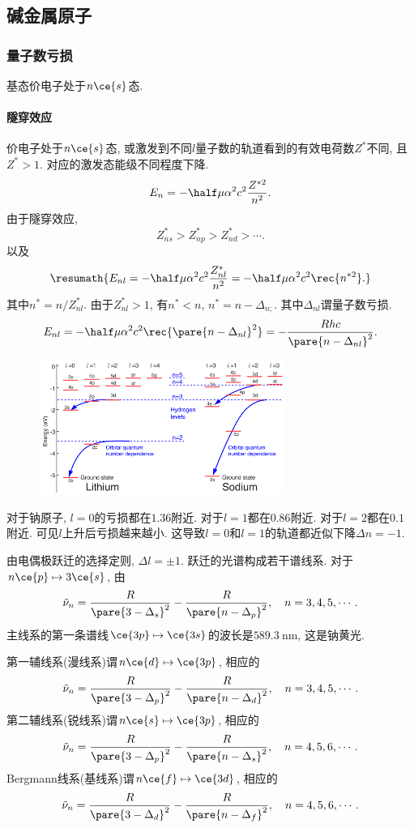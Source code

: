 \documentclass[hidelinks]{ctexart}
\begin{document}


\subsection{碱金属原子} %
\label{sub:碱金属原子}

\subsubsection{量子数亏损} %
\label{ssub:量子数亏损}

基态价电子处于$n\ce{s}$态.

\paragraph{隧穿效应} %
\label{par:隧穿效应}

价电子处于$n\ce{s}$态, 或激发到不同$l$量子数的轨道看到的有效电荷数$Z^*$不同, 且$Z^*>1$. 对应的激发态能级不同程度下降.
\[ E_n = -\half \mu \alpha^2 c^2 \frac{Z^{*2}}{n^2}. \]
由于隧穿效应,
\[ Z^*_{ns} > Z^*_{np} > Z^*_{nd} > \cdots. \]
以及
\[ \resumath{E_{nl} = -\half \mu\alpha^2 c^2 \frac{Z^*_{nl}}{n^2} = -\half \mu \alpha^2c^2 \rec{n^{*2}}.} \]
其中$\displaystyle n^* = n/Z_{nl}^*$. 由于$Z^*_{nl} > 1$, 有$n^* < n$, $n^* = n - \Delta_{n;}$. 其中$\Delta_{nl}$谓量子数亏损.
\[ E_{nl} = -\half \mu\alpha^2c^2 \rec{\pare{n-\Delta_{nl}}^2} = -\frac{Rhc}{\pare{n-\Delta_{nl}}^2}. \]
\begin{figure}[ht]
    \centering
    \includegraphics[width=8cm]{src/LevelComp.png}
\end{figure}
\par
对于钠原子, $l=0$的亏损都在$1.36$附近. 对于$l=1$都在$0.86$附近. 对于$l=2$都在$0.1$附近. 可见$l$上升后亏损越来越小. 这导致$l=0$和$l=1$的轨道都近似下降$\Delta n = -1$.
\par
由电偶极跃迁的选择定则, $\Delta l = \pm 1$. 跃迁的光谱构成若干谱线系. 对于$n\ce{p}\mapsto 3\ce{s}$, 由
\[ \tilde{\nu}_n = \frac{R}{\pare{3-\Delta_s}^2} - \frac{R}{\pare{n-\Delta_p}^2},\quad n = 3,4,5,\cdots. \]
主线系的第一条谱线$\ce{3p}\mapsto\ce{3s}$的波长是$\SI{589.3}{\nano\meter}$, 这是钠黄光.
\par
第一辅线系(漫线系)谓$n\ce{d}\mapsto \ce{3p}$, 相应的
\[ \tilde{\nu}_n = \frac{R}{\pare{3-\Delta_p}^2} - \frac{R}{\pare{n-\Delta_d}^2},\quad n = 3,4,5,\cdots. \]
第二辅线系(锐线系)谓$n\ce{s}\mapsto \ce{3p}$, 相应的
\[ \tilde{\nu}_n = \frac{R}{\pare{3-\Delta_p}^2} - \frac{R}{\pare{n-\Delta_s}^2},\quad n = 4,5,6,\cdots. \]
Bergmann线系(基线系)谓$n\ce{f}\mapsto \ce{3d}$, 相应的
\[ \tilde{\nu}_n = \frac{R}{\pare{3-\Delta_d}^2} - \frac{R}{\pare{n-\Delta_f}^2},\quad n = 4,5,6,\cdots. \]
\end{document}
